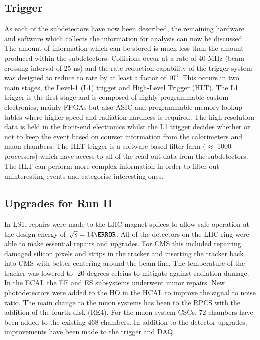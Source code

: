 \subsection{Trigger}
As each of the subdetectors have now been described, the remaining hardware and software which collects the information for analysis can now be discussed. The amount of information which can be stored is much less than the amount produced within the subdetectors. Collisions occur at a rate of 40 MHz (beam crossing interval of 25 ns) and the rate reduction capability of the trigger system was designed to reduce to rate by at least a factor of $10^6$. This occurs in two main stages, the Level-1 (L1) trigger and High-Level Trigger (HLT). The L1 trigger is the first stage and is composed of highly programmable custom electronics, mainly FPGAs but also ASIC and programmable memory lookup tables where higher speed and radiation hardness is required. The high resolution data is held in the front-end electronics whilst the L1 trigger decides whether or not to keep the event based on courser information from the calorimeters and muon chambers. The HLT trigger is a software based filter farm ($\approx$ 1000 processers) which have access to all of the read-out data from the subdetectors. The HLT can perform more complex information in order to filter out uninteresting events and categorise interesting ones.


\subsection{Upgrades for Run II}

In LS1, repairs were made to the LHC magnet splices to allow safe operation at the design energy of $\sqrt{s} = 14 \TeV$. All of the detectors on the LHC ring were able to make essential repairs and upgrades. For CMS this included repairing damaged silicon pixels and strips in the tracker and inserting the tracker back into CMS with better centering around the beam line. The temperature of the tracker was lowered to -20 degrees celcius to mitigate against radiation damage. In the ECAL the EE and ES subsystems underwent minor repairs. New photodetectors were added to the HO in the HCAL to improve the signal to noise ratio. The main change to the muon systems has been to the RPCS with the addition of the fourth disk (RE4). For the muon system CSCs, 72 chambers have been added to the existing 468 chambers. In addition to the detector upgrades, improvements have been made to the trigger and DAQ.

